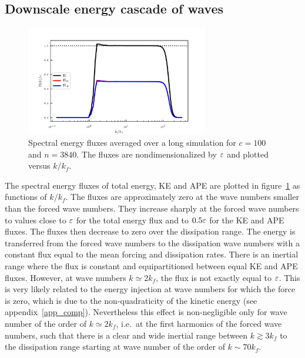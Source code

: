

\subsection{Downscale energy cascade of waves}
\label{subsection_cascade}



\begin{figure}
\centerline{\includegraphics[width=3.15in]{../Pyfig/fig_spect_energy_budg_c=100_N=3840}}
\caption{Spectral energy fluxes averaged over a long simulation for $c
= 100$ and $n = 3840$.  The fluxes are nondimensionalized by $\varepsilon$
and plotted versus $k/k_f$.  }
\label{fig_seb}
\end{figure}


The spectral energy fluxes of total energy, KE and APE are plotted in
figure~\ref{fig_seb} as functions of $k/k_f$.
%
The fluxes are approximately zero at the wave numbers smaller than the
forced wave numbers.  They increase sharply at the forced wave numbers
to values close to $\varepsilon$ for the total energy flux and to $0.5\varepsilon$
for the KE and APE fluxes.  The fluxes then decrease to zero over the
dissipation range.
%
The energy is transferred from the forced wave numbers to the
dissipation wave numbers with a constant flux equal to the mean
forcing and dissipation rates.
%
There is an inertial range where the flux is constant and
equipartitioned between equal KE and APE fluxes.
%
However, at wave numbers $k \simeq 2 k_f$, the flux is not exactly
equal to $\varepsilon$.  This is very likely related to the energy injection
at wave numbers for which the force is zero, which is due to the
non-quadraticity of the kinetic energy (see appendix~\ref{app_comp}).
%
Nevertheless this effect is non-negligible only for wave number of the
order of $k\simeq 2 k_f$, i.e.\ at the first harmonics of the forced
wave numbers, such that there is a clear and wide inertial range
between $k\gtrsim 3 k_f$ to the dissipation range starting at wave
number of the order of $k \sim 70 k_f$.




